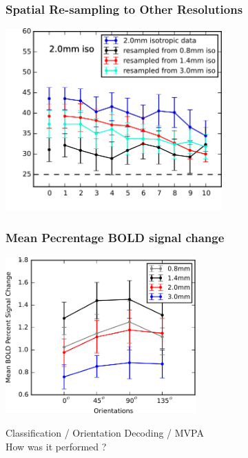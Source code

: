 \documentclass{beamer}
\begin{document}
  \begin{frame}
    \frametitle{Spatial Re-sampling to Other Resolutions}
        \begin{center}
            \includegraphics[height=7cm]{../pictures/resampling}
        \end{center}
    \end{frame}
    
  \begin{frame}
    \frametitle{Mean Pecrentage BOLD signal change}
        \begin{center}
            \includegraphics[height=6cm]{../pictures/signal_change}
        \end{center}
    \end{frame} 

  \begin{frame}
        \begin{center}
            Classification / Orientation Decoding / MVPA \\ How was it performed ?
        \end{center}
    \end{frame} 
\end{document}
